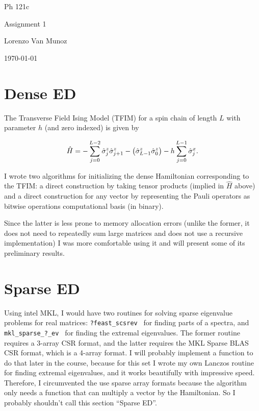 \documentclass{article}
\begin{document}
{\centering

Ph 121c

Assignment 1

Lorenzo Van Munoz

\today

}

\tableofcontents

\newpage

\section{
Dense ED
}

The Transverse Field Ising Model (TFIM) for a spin chain
of length $L$ with parameter $h$ (and zero indexed) is given by

\begin{align}
    \hat H = - \sum_{j=0}^{L-2} \hat \sigma^z_{j} \hat \sigma^z_{j+1} 
            - \qty( \hat \sigma^z_{L-1}  \hat \sigma^z_{0} )
            - h\sum_{j=0}^{L-1}  \hat \sigma^x_{j}.
\end{align}

I wrote two algorithms for initializing the dense Hamiltonian
corresponding to the TFIM: a direct construction by taking
tensor products (implied in $\hat H$ above) and a direct construction
for any vector by representing the Pauli operators
as bitwise operations computational basis (in binary).

Since the latter is less prone to memory allocation errors 
(unlike the former, it does not need to repeatedly sum large matrices
and does not use a recursive implementation) I was more comfortable
using it and will present some of its preliminary results.

\newpage

\section{
Sparse ED
}

Using intel MKL, I would have two routines for solving
sparse eigenvalue problems for real matrices:
{\tt ?feast\_scsrev } for finding parts of a spectra, and
{\tt mkl\_sparse\_?\_ev } for finding the extremal eigenvalues.
The former routine requires a 3-array CSR format, and the latter
requires the MKL Sparse BLAS CSR format, which is a 4-array format.
I will probably implement a function to do that later in the course,
because for this set I wrote my own Lanczos routine for finding extremal
eigenvalues, and it works beautifully with impressive speed.
Therefore, I circumvented the use sparse array formats because the algorithm
only needs a function that can multiply a vector by the Hamiltonian.
So I probably shouldn't call this section ``Sparse ED''.
\end{document}
